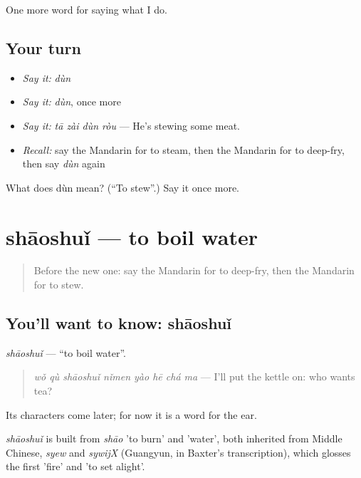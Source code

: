 \begin{grammarlens}[title={What you've built}]
One more word for saying what I do.
\end{grammarlens}

\subsection*{Your turn}
\begin{itemize}
\raggedright
  \item \emph{Say it:} \emph{dùn}
  \item \emph{Say it:} \emph{dùn}, once more
  \item \emph{Say it:} \emph{tā zài dùn ròu} — He's stewing some meat.
  \item \emph{Recall:} say the Mandarin for to steam, then the Mandarin for to deep-fry, then say \emph{dùn} again
\end{itemize}

\begin{tcolorbox}[breakable,colback=teal!4,colframe=teal!35!black,title={Before you move on}]
What does dùn mean? (\textquotedblleft{}To stew\textquotedblright{}.) Say it once more.
\end{tcolorbox}
\section[shāoshuǐ]{shāoshuǐ — to boil water}

\label{lesson:ZH-C168-shaoshui}



\begin{quote}
Before the new one: say the Mandarin for to deep-fry, then the Mandarin for to stew.
\end{quote}

\subsection*{You'll want to know: shāoshuǐ}
\emph{shāoshuǐ} — \textquotedblleft{}to boil water\textquotedblright{}.

\begin{quote}
\emph{wǒ qù shāoshuǐ nǐmen yào hē chá ma} — I'll put the kettle on: who wants tea?
\end{quote}

Its characters come later; for now it is a word for the ear.

\begin{cousinweb}
\emph{shāoshuǐ} is built from \emph{shāo} 'to burn' and  'water', both inherited from Middle Chinese, \emph{syew} and \emph{sywijX} (Guangyun, in Baxter's transcription), which glosses the first 'fire' and 'to set alight'.
\end{cousinweb}

